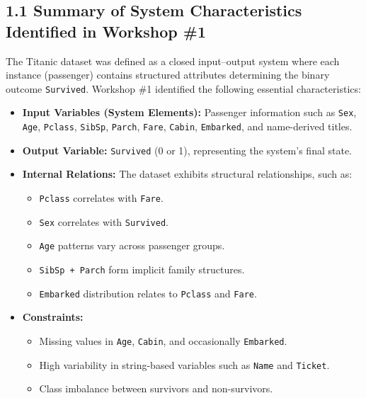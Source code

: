 \documentclass[12pt]{report}
\begin{document}
\subsection*{1.1 Summary of System Characteristics Identified in Workshop \#1}

The Titanic dataset was defined as a closed input--output system where each instance
(passenger) contains structured attributes determining the binary outcome \texttt{Survived}.
Workshop \#1 identified the following essential characteristics:

\begin{itemize}
    \item \textbf{Input Variables (System Elements):}
    Passenger information such as \texttt{Sex}, \texttt{Age}, \texttt{Pclass},
    \texttt{SibSp}, \texttt{Parch}, \texttt{Fare}, \texttt{Cabin}, \texttt{Embarked},
    and name-derived titles.
    
    \item \textbf{Output Variable:}
    \texttt{Survived} (0 or 1), representing the system’s final state.

    \item \textbf{Internal Relations:}
    The dataset exhibits structural relationships, such as:
    \begin{itemize}
        \item \texttt{Pclass} correlates with \texttt{Fare}.
        \item \texttt{Sex} correlates with \texttt{Survived}.
        \item \texttt{Age} patterns vary across passenger groups.
        \item \texttt{SibSp + Parch} form implicit family structures.
        \item \texttt{Embarked} distribution relates to \texttt{Pclass} and \texttt{Fare}.
    \end{itemize}

    \item \textbf{Constraints:}
    \begin{itemize}
        \item Missing values in \texttt{Age}, \texttt{Cabin}, and occasionally \texttt{Embarked}.
        \item High variability in string-based variables such as \texttt{Name} and \texttt{Ticket}.
        \item Class imbalance between survivors and non-survivors.
    \end{itemize}


\end{itemize}
\end{document}
